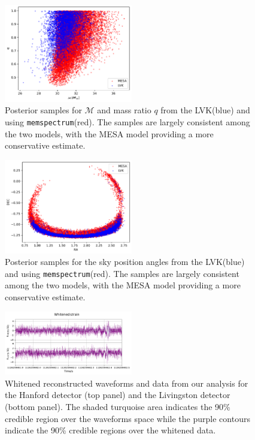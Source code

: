 \documentclass{aa}
\begin{document}
\begin{figure}
	\caption{Posterior samples for $\mathcal{M}$ and mass ratio $q$ from the LVK(blue) and using \texttt{memspectrum}(red). The samples are largely consistent among the two models, with the MESA model providing a more conservative estimate.}
	\label{fig:gw150914_masses}
	\includegraphics[width=0.5\textwidth,keepaspectratio]{Images/gw150914/masses.pdf}
\end{figure}
\begin{figure}
	\caption{Posterior samples for the sky position angles from the LVK(blue) and using \texttt{memspectrum}(red). The samples are largely consistent among the two models, with the MESA model providing a more conservative estimate.}
	\label{fig:gw150914_sky}
	\includegraphics[width=0.5\textwidth,keepaspectratio]{Images/gw150914/sky_position.pdf}
\end{figure}
\begin{figure}
	\caption{Whitened reconstructed waveforms and data from our analysis for the Hanford detector (top panel) and the Livingston detector (bottom panel). The shaded turquoise area indicates the 90\% credible region over the waveforms space while the purple contours indicate the 90\% credible regions over the whitened data.}
	\label{fig:gw150914_waveforms}
	\includegraphics[width=0.5\textwidth,keepaspectratio]{Images/gw150914/waveforms.pdf}
\end{figure}
\end{document}
